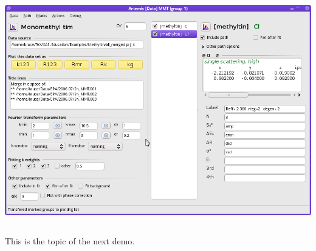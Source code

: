 \documentclass[10pt, xcolor=x11names, compress]{beamer}
\begin{document}
\begin{frame}
\begin{columns}
\begin{column}{0.5\linewidth}
      \smallskip

      \includegraphics[width=0.8\linewidth]{images/mtin_fit2.png}
    \end{column}
  \end{columns}
  \begin{bottomnote}[0.5][19.25]
    This is the topic of the next demo.
  \end{bottomnote}
\end{frame}
\end{document}
